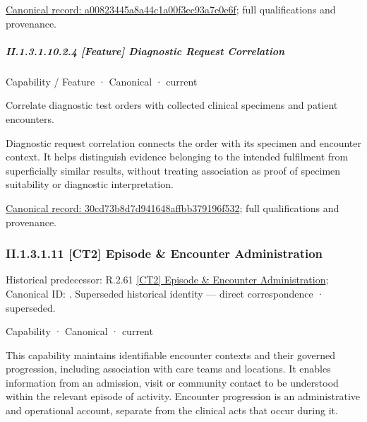 {\footnotesize \href{../../../../continuum/strategy/capability/feature/a00823445a8a44c1a00f3ec93a7e0e6f.md}{Canonical record: a00823445a8a44c1a00f3ec93a7e0e6f}; full qualifications and provenance.}\par
\subparagraph*{II.1.3.1.10.2.4 [Feature] Diagnostic Request Correlation}
\label{navigation:II.1.3.1.10.2.4}

\label{element:30cd73b8d7d941648affbb379196f532}
{\small Capability / Feature · Canonical · current}\par

Correlate diagnostic test orders with collected clinical specimens and patient encounters.



Diagnostic request correlation connects the order with its specimen and encounter context. It helps distinguish evidence belonging to the intended fulfilment from superficially similar results, without treating association as proof of specimen suitability or diagnostic interpretation.


{\footnotesize \href{../../../../continuum/strategy/capability/feature/30cd73b8d7d941648affbb379196f532.md}{Canonical record: 30cd73b8d7d941648affbb379196f532}; full qualifications and provenance.}\par
\subsubsection*{II.1.3.1.11 [CT2] Episode \& Encounter Administration}
\label{navigation:II.1.3.1.11}

{\small Historical predecessor: R.2.61 \hyperref[element:2778f988e8d44e3091749542c39d38a4]{[CT2] Episode \& Encounter Administration}; Canonical ID: \texttt{}. Superseded historical identity — direct correspondence · superseded.}\par
\label{element:61d7067aee0540259b3daca4287d66d2}
{\small Capability · Canonical · current}\par

This capability maintains identifiable encounter contexts and their governed progression, including association with care teams and locations. It enables information from an admission, visit or community contact to be understood within the relevant episode of activity. Encounter progression is an administrative and operational account, separate from the clinical acts that occur during it.



